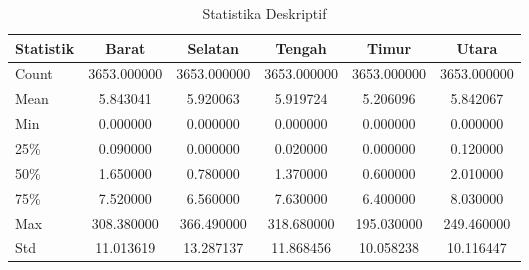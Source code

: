 \begin{table}[H]
    \centering
    \footnotesize
    \caption{Statistika Deskriptif}
    \label{table:statistik_deskriptif}
    \begin{tabular}{lccccc}
        \toprule
        \textbf{Statistik} & \textbf{Barat} & \textbf{Selatan} & \textbf{Tengah} & \textbf{Timur} & \textbf{Utara} \\
        \midrule
        Count & 3653.000000 & 3653.000000 & 3653.000000 & 3653.000000 & 3653.000000 \\
        Mean  & 5.843041    & 5.920063    & 5.919724    & 5.206096    & 5.842067    \\
        Min   & 0.000000    & 0.000000    & 0.000000    & 0.000000    & 0.000000    \\
        25\%  & 0.090000    & 0.000000    & 0.020000    & 0.000000    & 0.120000    \\
        50\%  & 1.650000    & 0.780000    & 1.370000    & 0.600000    & 2.010000    \\
        75\%  & 7.520000    & 6.560000    & 7.630000    & 6.400000    & 8.030000    \\
        Max   & 308.380000  & 366.490000  & 318.680000  & 195.030000  & 249.460000  \\
        Std   & 11.013619   & 13.287137   & 11.868456   & 10.058238   & 10.116447   \\
        \bottomrule
    \end{tabular}
\end{table}